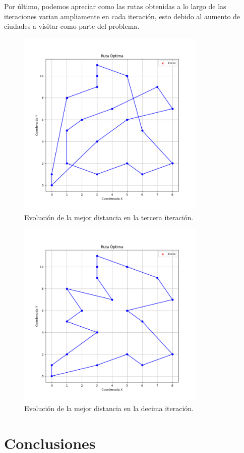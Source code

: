 \documentclass{article}
\begin{document}
  \newpage
  Por último, podemos apreciar como las rutas obtenidas a lo largo de las iteraciones varian ampliamente en cada iteración, esto debido al aumento de ciudades a visitar como parte del problema.
  \begin{figure}[h]
    \centering
    \includegraphics[width=9cm]{img/203Ruta.png}
    \caption{Evolución de la mejor distancia en la tercera iteración.}
    \label{fig:etiqueta9}
  \end{figure}

  
  \begin{figure}[h]
    \centering
    \includegraphics[width=9cm]{img/2015Ruta.png}
    \caption{Evolución de la mejor distancia en la decima iteración.}
    \label{fig:etiqueta10}
  \end{figure}


\clearpage
\section{Conclusiones}
\end{document}
